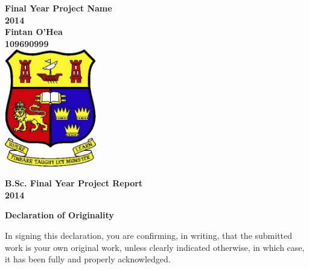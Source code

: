 \documentclass[a4paper, 12pt]{report}
\begin{document}
\lstset{language=JavaScript, basicstyle=\footnotesize\ttfamily, tabsize=1, showstringspaces=false}
\begin{titlepage}
    \centering
    \vfill
    {\bfseries\Large
        Final Year Project Name\\
        2014\\
        \vskip2cm
        Fintan O'Hea\\
        109690999\\
    }    
    \vfill
    \includegraphics[width=4cm]{ucc_crest.jpg} %
    \vfill
    \vfill
\end{titlepage}

\clearpage

\begin{center}
\Large \textbf{B.Sc. Final Year Project Report \\
2014}
\end{center}
\begin{flushleft}
\end{flushleft}
\begin{center}
\Large \textbf{Declaration of Originality}
\end{center}
In signing this declaration, you are confirming, in writing, that the submitted work is your own original work, unless clearly indicated otherwise, in which case, it has been fully and properly acknowledged. \\
\end{document}
